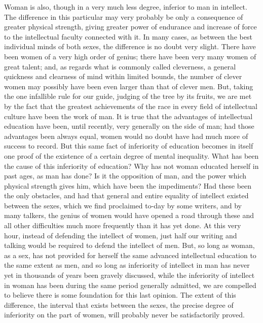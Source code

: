 \begin{linenumbers}
\indent Woman is also, though in a very much less degree, inferior to man in intellect. The difference in this particular may very probably be only a consequence of greater physical strength, giving greater power of endurance and increase of force to the intellectual faculty connected with it. In many cases, as between the best individual minds of both sexes, the difference is no doubt very slight. There have been women of a very high order of genius; there have been very many women of great talent; and, as regards what is commonly called cleverness, a general quickness and clearness of mind within limited bounds, the number of clever women may possibly have been even larger than that of clever men. But, taking the one infallible rule for our guide, judging of the tree by its fruits, we are met by the fact that the greatest achievements of the race in every field of intellectual culture have been the work of man. It is true that the advantages of intellectual education have been, until recently, very generally on the side of man; had those advantages been always equal, women would no doubt have had much more of success to record. But this same fact of inferiority of education becomes in itself one proof of the existence of a certain degree of mental inequality. What has been the cause of this inferiority of education? Why has not woman educated herself in past ages, as man has done? Is it the opposition of man, and the power which physical strength gives him, which have been the impediments? Had these been the only obstacles, and had that general and entire equality of intellect existed between the sexes, which we find proclaimed to-day by some writers, and by many talkers, the genius of women would have opened a road through these and all other difficulties much more frequently than it has yet done. At this very hour, instead of defending the intellect of women, just half our writing and talking would be required to defend the intellect of men. But, so long as woman, as a sex, has not provided for herself the same advanced intellectual education to the same extent as men, and so long as inferiority of intellect in man has never yet in thousands of years been gravely discussed, while the inferiority of intellect in woman has been during the same period generally admitted, we are compelled to believe there is some foundation for this last opinion. The extent of this difference, the interval that exists between the sexes, the precise degree of inferiority on the part of women, will probably never be satisfactorily proved.


\end{linenumbers}
